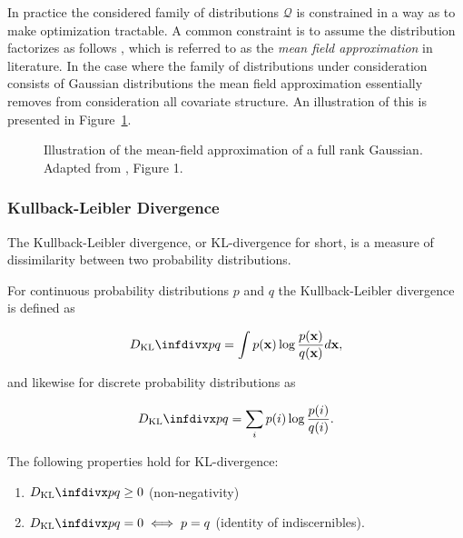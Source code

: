 In practice the considered family of distributions $\mathcal{Q}$ is constrained in a way as to make optimization tractable. A common constraint is to assume the distribution factorizes as follows , which is referred to as the \textit{mean field approximation} in literature. In the case where the family of distributions under consideration consists of Gaussian distributions the mean field approximation essentially removes from consideration all covariate structure. An illustration of this is presented in Figure~\ref{fig:mean_field_approximation}.


\begin{figure}[!htb]
  \centering
  \resizebox{0.5\textwidth}{!}{\unskip}
  \caption{Illustration of the mean-field approximation of a full rank Gaussian. Adapted from \cite{variational_inference_review}, Figure 1.}
  \label{fig:mean_field_approximation}
\end{figure}

\subsubsection{Kullback-Leibler Divergence}

The Kullback-Leibler divergence, or KL-divergence for short, is a measure of dissimilarity between two probability distributions.

For continuous probability distributions $p$ and $q$ the Kullback-Leibler divergence is defined as

$$\dkl{p}{q} = \int p(\mathbf{x}) \log \frac{p(\mathbf{x})}{q(\mathbf{x})} d\mathbf{x},$$

and likewise for discrete probability distributions as

$$\dkl{p}{q} = \sum_{i} p(i) \log \frac{p(i)}{q(i)}.$$

The following properties hold for KL-divergence:

\begin{enumerate}
\item $\dkl{p}{q} \geq 0$ (non-negativity)
\item $\dkl{p}{q} = 0 \iff p = q$ (identity of indiscernibles).
\end{enumerate}

